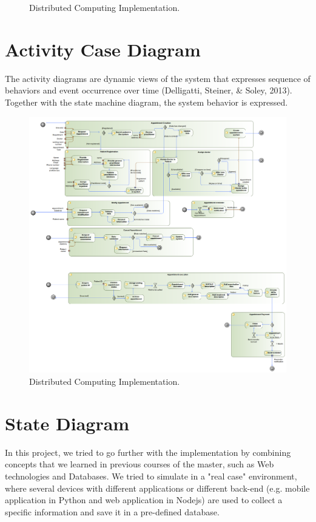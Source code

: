 \documentclass{article}
\begin{document}
\begin{figure}[H]
                \caption{Distributed Computing Implementation.}
                \label{fig:architecture}
            \end{figure}
            \section{Activity Case Diagram}
            The activity diagrams are dynamic views of the system that expresses sequence of
            behaviors and event occurrence over time (Delligatti, Steiner, & Soley, 2013). Together
            with the state machine diagram, the system behavior is expressed.
            \begin{figure}[H]
                \centering 
                \includegraphics[width=1\linewidth]{./img/Activity.png}
                \caption{Distributed Computing Implementation.}
                \label{fig:architecture}
            \end{figure}
            \section{State Diagram}
            In this project, we tried to go further with the implementation by combining concepts that we learned in previous courses of the master, such as Web technologies and Databases.  
            We tried to simulate in a "real case" environment, where several devices with different applications or different back-end (e.g. mobile application in Python and web application in Nodejs) are used to collect a specific information and save it in a pre-defined database.
    
\end{document}
